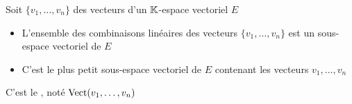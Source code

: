 \begin{frame}
Soit  $\{v_1, \dots , v_n\}$  des vecteurs d'un 
$\mathbb{K}$-espace vectoriel $E$
\begin{theoreme}
\begin{itemize}
  \item L'ensemble des combinaisons linéaires des vecteurs 
  $\{v_1, \dots , v_n\}$ est un sous-espace vectoriel de $E$
  \pause  
  \item C'est le plus petit sous-espace vectoriel de $E$ 
  contenant les vecteurs  $v_1, \ldots , v_n$ 
\end{itemize}
 
\end{theoreme}

\medskip
\pause

C'est le , noté $\mathop{\text{Vect}}\nolimits (v_1, \ldots , v_n )$

\pause



\end{frame}


